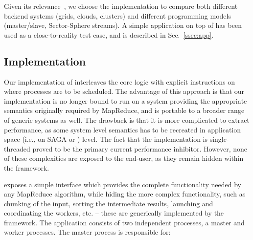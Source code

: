 \documentclass[3p,twocolumn]{elsarticle}
\begin{document}
 Given its relevance~\cite{saga_ccgrid09}, we choose the \smr
 implementation to compare both different backend systems (grids,
 clouds, clusters) and different programming models (master/slave,
 Sector-Sphere streams).  A simple \wc application on top of
 \smr has been used as a close-to-reality test case, and is
 described in Sec.~\ref{ssec:app}.


\subsection{\sagamapreduce Implementation}


Our implementation of \sagamapreduce interleaves the core \mr logic
with explicit instructions on where processes are to be scheduled.
The advantage of this approach is that our implementation is no longer
bound to run on a system providing the appropriate semantics
originally required by MapReduce, and is portable to a broader range
of generic systems as well.  The drawback is that it is more
complicated to extract performance, as some system level semantics has
to be recreated in application space (i.e., on SAGA or \smr) level.
The fact that the implementation is single-threaded proved to be the
primary current performance inhibitor.  However, none of these
complexities are exposed to the end-user, as they remain hidden within
the framework. 


\smr exposes a simple interface which provides the complete
functionality needed by any MapReduce algorithm, while hiding the more
complex functionality, such as chunking of the input, sorting the
intermediate results, launching and coordinating the workers, etc. --
these are generically implemented by the framework.  The application
consists of two independent processes, a master and worker processes.
The master process is responsible for:
\end{document}
